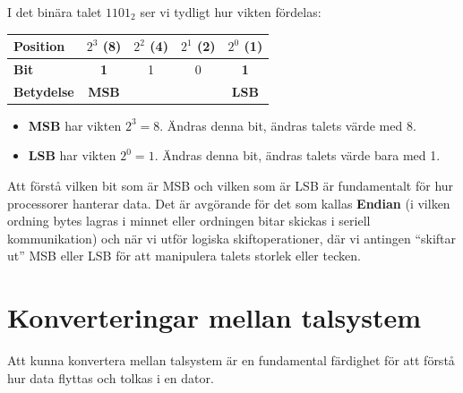 \documentclass[
  swedish,
  letterpaper,
  oneside,
  openany]{book}
\newcounter{none} %
\providecommand{\tightlist}{%
  \setlength{\itemsep}{0pt}\setlength{\parskip}{0pt}}
\begin{document}
\begin{tcolorbox}[enhanced jigsaw, arc=.35mm, bottomrule=.15mm, bottomtitle=1mm, breakable, colback=white, colbacktitle=quarto-callout-note-color!10!white, colframe=quarto-callout-note-color-frame, coltitle=black, left=2mm, leftrule=.75mm, opacityback=0, opacitybacktitle=0.6, rightrule=.15mm, title=\textcolor{quarto-callout-note-color}{\faInfo}\hspace{0.5em}{Exempel: Viktning av bitar i talet \(1101_2\)}, titlerule=0mm, toprule=.15mm, toptitle=1mm]

I det binära talet \textbf{\(1101_2\)} ser vi tydligt hur vikten
fördelas:

{\def\LTcaptype{none} %
\begin{longtable}[]{@{}lcccc@{}}
\toprule\noalign{}
Position & \(2^3\) (8) & \(2^2\) (4) & \(2^1\) (2) & \(2^0\) (1) \\
\midrule\noalign{}
\endhead
\bottomrule\noalign{}
\endlastfoot
\textbf{Bit} & \textbf{1} & 1 & 0 & \textbf{1} \\
\textbf{Betydelse} & \textbf{MSB} & & & \textbf{LSB} \\
\end{longtable}
}

\begin{itemize}
\tightlist
\item
  \textbf{MSB} har vikten \(2^3 = 8\). Ändras denna bit, ändras talets
  värde med 8.
\item
  \textbf{LSB} har vikten \(2^0 = 1\). Ändras denna bit, ändras talets
  värde bara med 1.
\end{itemize}

\end{tcolorbox}

Att förstå vilken bit som är MSB och vilken som är LSB är fundamentalt
för hur processorer hanterar data. Det är avgörande för det som kallas
\textbf{Endian} (i vilken ordning bytes lagras i minnet eller ordningen
bitar skickas i seriell kommunikation) och när vi utför logiska
skiftoperationer, där vi antingen ``skiftar ut'' MSB eller LSB för att
manipulera talets storlek eller tecken.

\section{Konverteringar mellan
talsystem}\label{konverteringar-mellan-talsystem}

Att kunna konvertera mellan talsystem är en fundamental färdighet för
att förstå hur data flyttas och tolkas i en dator.
\end{document}

